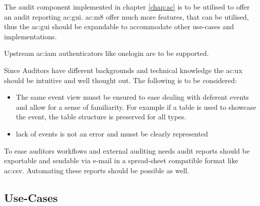 

The audit component implemented in chapter \ref{chap:ac} is to be utilised to offer an audit reporting \gls{ac:gui}. \gls{ac:m8} offer much more features, that can be utilised, thus the \gls{ac:gui} should be expandable to accommodate other use-cases and implementations.

Upstream \gls{ac:iam} authenticators like onelogin are to be supported.

Since Auditors have different backgrounds and technical knowledge the \gls{ac:ux} should be intuitive and well thought out. The following is to be considered:

\begin{itemize}
  \item The same event view musst be ensured to ease dealing with deferent events and allow for a sense of familiarity. For example if a table is used to showcase the event, the table structure is preserved for all types.
  \item lack of events is not an error and musst be clearly represented
\end{itemize}

To ease auditors workflows and external auditing needs audit reports should be exportable and sendable via e-mail in a spread-sheet compatible format like \gls{ac:csv}. Automating these reports should be possible as well.



\subsection{Use-Cases}

